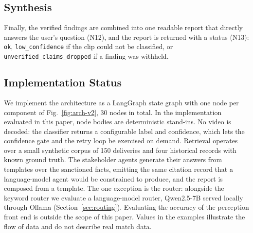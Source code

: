\subsection{Synthesis}
Finally, the verified findings are combined into one readable report that directly answers the user's question (N12), and the report is returned with a status (N13): \texttt{ok}, \texttt{low\_confidence} if the clip could not be classified, or \texttt{unverified\_claims\_dropped} if a finding was withheld.

\subsection{Implementation Status}
We implement the architecture as a LangGraph state graph with one node per component of Fig.~\ref{fig:arch-v2}, 30 nodes in total. In the implementation evaluated in this paper, node bodies are deterministic stand-ins. No video is decoded: the classifier returns a configurable label and confidence, which lets the confidence gate and the retry loop be exercised on demand. Retrieval operates over a small synthetic corpus of 150 deliveries and four historical records with known ground truth. The stakeholder agents generate their answers from templates over the sanctioned facts, emitting the same citation record that a language-model agent would be constrained to produce, and the report is composed from a template. The one exception is the router: alongside the keyword router we evaluate a language-model router, Qwen2.5-7B served locally through Ollama (Section~\ref{sec:routing}). Evaluating the accuracy of the perception front end is outside the scope of this paper. Values in the examples illustrate the flow of data and do not describe real match data.
